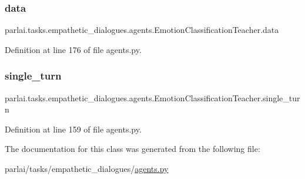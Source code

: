 \subsubsection{\texorpdfstring{data}{data}}
{\footnotesize\ttfamily parlai.\+tasks.\+empathetic\+\_\+dialogues.\+agents.\+Emotion\+Classification\+Teacher.\+data}



Definition at line 176 of file agents.\+py.

\mbox{\label{classparlai_1_1tasks_1_1empathetic__dialogues_1_1agents_1_1EmotionClassificationTeacher_a89801cdf1ce6967ca038b50cd9caa94e}} 
\subsubsection{\texorpdfstring{single\+\_\+turn}{single\_turn}}
{\footnotesize\ttfamily parlai.\+tasks.\+empathetic\+\_\+dialogues.\+agents.\+Emotion\+Classification\+Teacher.\+single\+\_\+turn}



Definition at line 159 of file agents.\+py.



The documentation for this class was generated from the following file\+:\begin{DoxyCompactItemize}
\item 
parlai/tasks/empathetic\+\_\+dialogues/\hyperlink{parlai_2tasks_2empathetic__dialogues_2agents_8py}{agents.\+py}\end{DoxyCompactItemize}
